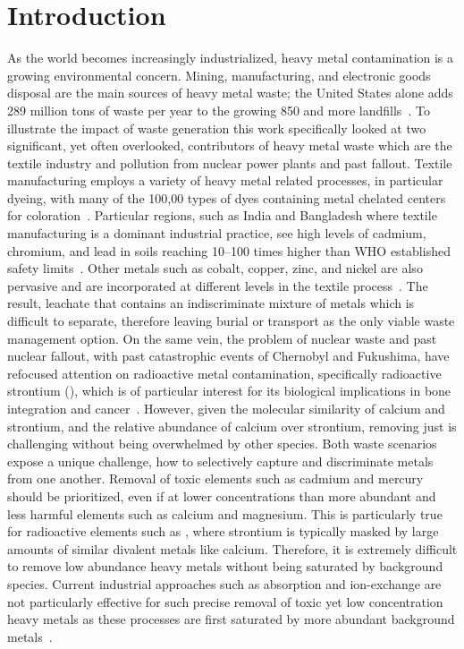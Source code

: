 \documentclass[../main/main]{subfiles}
\begin{document}
\section{Introduction}
\label{chapter3-intro}
As the world becomes increasingly industrialized, heavy metal contamination is a growing environmental concern. Mining, manufacturing, and electronic goods disposal are the main sources of heavy metal waste; the United States alone adds 289 million tons of waste per year to the growing 850 and more landfills~\cite{powell2016estimates}. To illustrate the impact of waste generation this work specifically looked at two significant, yet often overlooked, contributors of heavy metal waste which are the textile industry and pollution from nuclear power plants and past fallout. Textile manufacturing employs a variety of heavy metal related processes, in particular dyeing, with many of the 100,00 types of dyes containing metal chelated centers for coloration~\cite{robinson2001}. Particular regions, such as India and Bangladesh where textile manufacturing is a dominant industrial practice, see high levels of cadmium, chromium, and lead in soils reaching 10--100 times higher than WHO established safety limits~\cite{manzoor2006}. Other metals such as cobalt, copper, zinc, and nickel are also pervasive and are incorporated at different levels in the textile process~\cite{robinson2001,manzoor2006}. The result, leachate that contains an indiscriminate mixture of metals which is difficult to separate, therefore leaving burial or transport as the only viable waste management option.
On the same vein, the problem of nuclear waste and past nuclear fallout, with past catastrophic events of Chernobyl and Fukushima, have refocused attention on radioactive metal contamination, specifically radioactive strontium (), which is of particular interest for its biological implications in bone integration and cancer~\cite{sahoo2016,shutov1993,mangano2011}. However, given the molecular similarity of calcium and strontium, and the relative abundance of calcium over strontium, removing just  is challenging without being overwhelmed by other species. Both waste scenarios expose a unique challenge, how to selectively capture and discriminate metals from one another. Removal of toxic elements such as cadmium and mercury should be prioritized, even if at lower concentrations than more abundant and less harmful elements such as calcium and magnesium. This is particularly true for radioactive elements such as , where strontium is typically masked by large amounts of similar divalent metals like calcium. Therefore, it is extremely difficult to remove low abundance heavy metals without being saturated by background species.
Current industrial approaches such as absorption and ion-exchange are not particularly effective for such precise removal of toxic yet low concentration heavy metals as these processes are first saturated by more abundant background metals~\cite{fu2011removal,kurniawan2006,kumargupta2012}.
\end{document}
